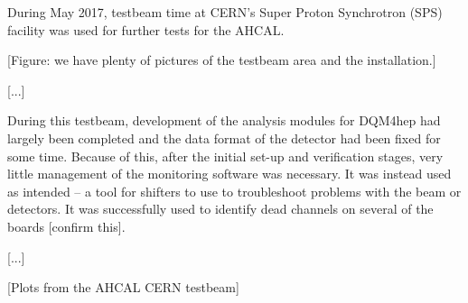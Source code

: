 During May 2017, testbeam time at CERN's Super Proton Synchrotron (SPS) facility was used for further tests for the AHCAL.

\begin{center}
	[Figure: we have plenty of pictures of the testbeam area and the installation.]
\end{center}

[...]

During this testbeam, development of the analysis modules for DQM4hep had largely been completed and the data format of the detector had been fixed for some time. Because of this, after the initial set-up and verification stages, very little management of the monitoring software was necessary. It was instead used as intended -- a tool for shifters to use to troubleshoot problems with the beam or detectors. It was successfully used to identify dead channels on several of the boards [confirm this].

[...]

\begin{center}
	[Plots from the AHCAL CERN testbeam]
\end{center}
